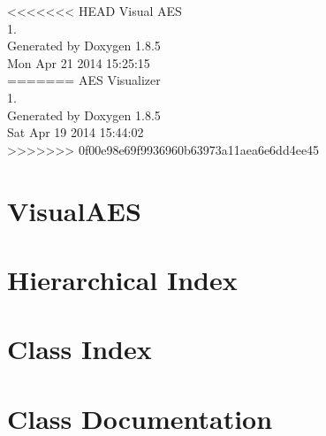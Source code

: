 \documentclass[twoside]{book}
\newcommand{\clearemptydoublepage}{%
  \newpage{\pagestyle{empty}\cleardoublepage}%
}
\begin{document}
\hypersetup{pageanchor=false}
\begin{titlepage}
\vspace*{7cm}
\begin{center}%
<<<<<<< HEAD
{\Large Visual A\-E\-S \\[1ex]\large 1. }\\
\vspace*{1cm}
{\large Generated by Doxygen 1.8.5}\\
\vspace*{0.5cm}
{\small Mon Apr 21 2014 15:25:15}\\
=======
{\Large A\-E\-S Visualizer \\[1ex]\large 1. }\\
\vspace*{1cm}
{\large Generated by Doxygen 1.8.5}\\
\vspace*{0.5cm}
{\small Sat Apr 19 2014 15:44:02}\\
>>>>>>> 0f00e98e69f9936960b63973a11aea6e6dd4ee45
\end{center}
\end{titlepage}
\clearemptydoublepage
\tableofcontents
\clearemptydoublepage
{}
\hypersetup{pageanchor=true}

\chapter{Visual\-A\-E\-S}
\label{md__r_e_a_d_m_e}
\hypertarget{md__r_e_a_d_m_e}{}

\chapter{Hierarchical Index}

\chapter{Class Index}

\chapter{Class Documentation}












\newpage
{}
{}
\printindex
\end{document}
